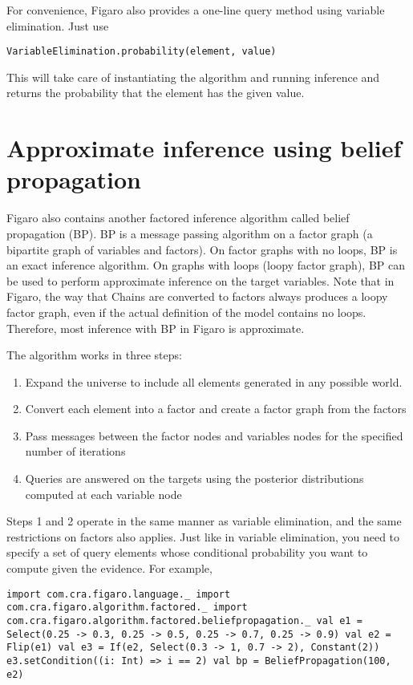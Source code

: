 For convenience, Figaro also provides a one-line query method using variable elimination. Just use

\texttt{VariableElimination.probability(element, value)}

This will take care of instantiating the algorithm and running inference and returns the probability that the element has the given value.

\section{Approximate inference using belief propagation}

Figaro also contains another factored inference algorithm called belief propagation (BP). BP is a message passing algorithm on a factor graph (a bipartite graph of variables and factors). On factor graphs with no loops, BP is an exact inference algorithm. On graphs with loops (loopy factor graph), BP can be used to perform approximate inference on the target variables. Note that in Figaro, the way that Chains are converted to factors always produces a loopy factor graph, even if the actual definition of the model contains no loops. Therefore, most inference with BP in Figaro is approximate.

The algorithm works in three steps:
\begin{enumerate}
\item Expand the universe to include all elements generated in any possible world.
\item Convert each element into a factor and create a factor graph from the factors
\item Pass messages between the factor nodes and variables nodes for the specified number of iterations
\item Queries are answered on the targets using the posterior distributions computed at each variable node
\end{enumerate}

Steps 1 and 2 operate in the same manner as variable elimination, and the same restrictions on factors also applies. Just like in variable elimination, you need to specify a set of query elements whose conditional probability you want to compute given the evidence. For example,

\begin{flushleft}
\texttt{import com.cra.figaro.language.\_
\newline import com.cra.figaro.algorithm.factored.\_
\newline import com.cra.figaro.algorithm.factored.beliefpropagation.\_
\newline 
\newline val e1 = Select(0.25 -> 0.3, 0.25 -> 0.5, 0.25 -> 0.7, 0.25 -> 0.9)
\newline val e2 = Flip(e1)
\newline val e3 = If(e2, Select(0.3 -> 1, 0.7 -> 2), Constant(2))
\newline e3.setCondition((i: Int) => i == 2)
\newline 
\newline val bp = BeliefPropagation(100, e2)}
\end{flushleft}

